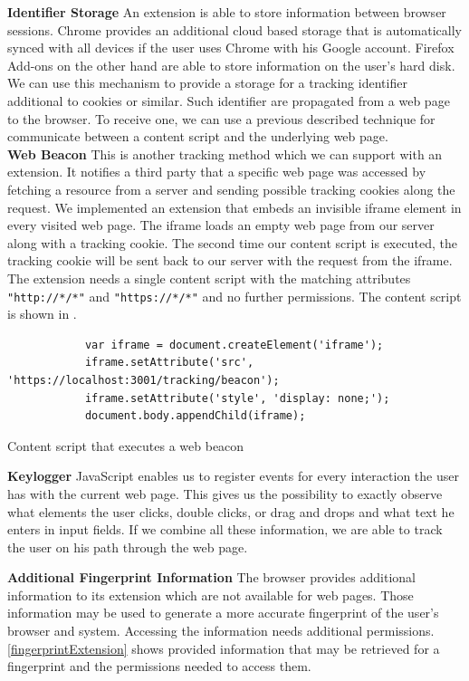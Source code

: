 		\textbf{Identifier Storage} An extension is able to store information between browser sessions. Chrome provides an additional cloud based storage that is automatically synced with all devices if the user uses Chrome with his Google account. Firefox Add-ons on the other hand are able to store information on the user's hard disk. We can use this mechanism to provide a storage for a tracking identifier additional to cookies or similar. Such identifier are propagated from a web page to the browser. To receive one, we can use a previous described technique for communicate between a content script and the underlying web page. \\
		
		
		\textbf{Web Beacon} This is another tracking method which we can support with an extension. It notifies a third party that a specific web page was accessed by fetching a resource from a server and sending possible tracking cookies along the request. We implemented an extension that embeds an invisible iframe element in every visited web page. The iframe loads an empty web page from our server along with a tracking cookie. The second time our content script is executed, the tracking cookie will be sent back to our server with the request from the iframe. The extension needs a single content script with the matching attributes \texttt{"http://*/*"} and \texttt{"https://*/*"} and no further permissions. The content script is shown in .
		
		\begin{code}
			\begin{lstlisting}
			var iframe = document.createElement('iframe');
			iframe.setAttribute('src', 'https://localhost:3001/tracking/beacon');
			iframe.setAttribute('style', 'display: none;');
			document.body.appendChild(iframe);
			\end{lstlisting}
			\caption{Content script that executes a web beacon}
			\label{contentScriptWebBeacon}
		\end{code}
		
		\textbf{Keylogger} JavaScript enables us to register events for every interaction the user has with the current web page. This gives us the possibility to exactly observe what elements the user clicks, double clicks, or drag and drops and what text he enters in input fields. If we combine all these information, we are able to track the user on his path through the web page. 
		
		\textbf{Additional Fingerprint Information} The browser provides additional information to its extension which are not available for web pages. Those information may be used to generate a more accurate fingerprint of the user's browser and system. Accessing the information needs additional permissions. \ref{fingerprintExtension} shows provided information that may be retrieved for a fingerprint and the permissions needed to access them. \\
		
